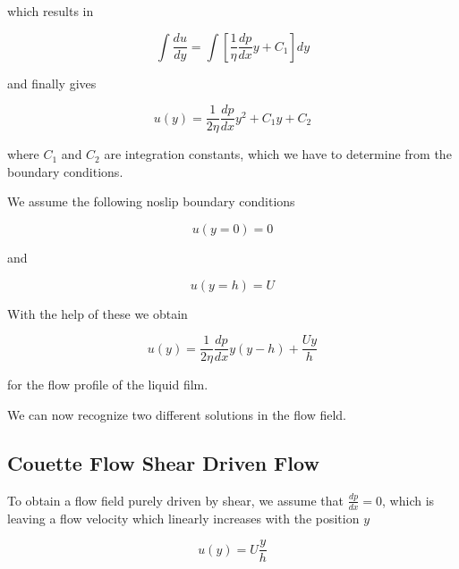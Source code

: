 \documentclass[letterpaper,10pt,english]{sphinxmanual}
\begin{document}
\sphinxAtStartPar
which results in

\sphinxAtStartPar
\begin{equation}
\int\frac{d u}{d y}=\int \left [ \frac{1}{\eta} \frac{dp}{dx}y+C_1 \right ] dy
\end{equation}

\sphinxAtStartPar
and finally gives

\sphinxAtStartPar
\begin{equation}
u(y)=\frac{1}{2\eta}\frac{dp}{dx}y^2+ C_1 y+ C_2
\end{equation}

\sphinxAtStartPar
where \(C_1\) and \(C_2\) are integration constants, which we have to determine from the boundary conditions.

\sphinxAtStartPar
We assume the following no\sphinxhyphen{}slip boundary conditions

\sphinxAtStartPar
\begin{equation}
u(y=0)=0
\end{equation}

\sphinxAtStartPar
and

\sphinxAtStartPar
\begin{equation}
u(y=h)=U
\end{equation}

\sphinxAtStartPar
With the help of these we obtain

\sphinxAtStartPar
\begin{equation}
u(y)=\frac{1}{2\eta}\frac{dp}{dx}y(y-h)+\frac{Uy}{h}
\end{equation}

\sphinxAtStartPar
for the flow profile of the liquid film.

\sphinxAtStartPar
We can now recognize two different solutions in the flow field.


\subsection{Couette Flow \sphinxhyphen{} Shear Driven Flow}
\label{\detokenize{notebooks/L18/1_Reynolds_Number:Couette-Flow---Shear-Driven-Flow}}
\sphinxAtStartPar
To obtain a flow field purely driven by shear, we assume that \(\frac{dp}{dx}=0\), which is leaving a flow velocity which linearly increases with the position \(y\)

\sphinxAtStartPar
\begin{equation}
u(y)=U\frac{y}{h}
\end{equation}
\end{document}
